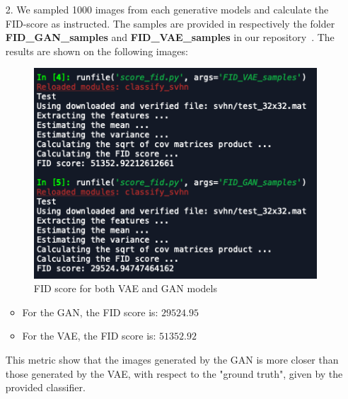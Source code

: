 \begin{itemize}
\begin{enumerate}
        \item[2.] We sampled 1000 images from each generative models and calculate the FID-score as instructed. The samples are provided in respectively the folder \textbf{FID\_GAN\_samples} and \textbf{FID\_VAE\_samples} in our repository~\cite{github}. The results are shown on the following images:
         \begin{figure}[H]
         	\centering
         	\includegraphics[scale=0.8]{FID.png}
         	\caption{FID score for both VAE and GAN models}
         	\label{fig:fid}
         \end{figure}
     
        \begin{itemize}
        	\item For the GAN, the FID score is: $29 524.95$
        	\item For the VAE, the FID score is: $51 352.92$
        \end{itemize}
        This metric show that the images generated by the GAN is more closer than those generated by the VAE, with respect to the "ground truth", given by the provided classifier.
        
    \end{enumerate}
\end{itemize}

